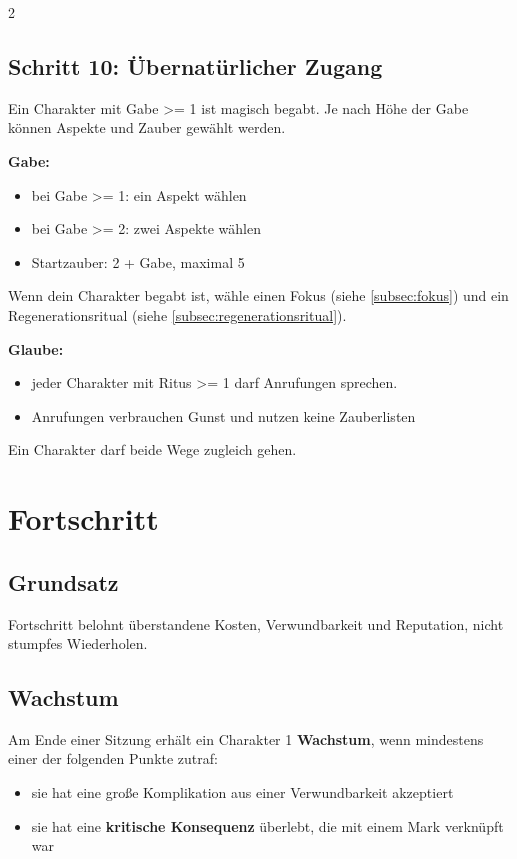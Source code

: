 \begin{multicols*}{2}
\subsection{Schritt 10: Übernatürlicher Zugang}\label{subsec:schritt-10:-ubernaturlicher-zugang}

Ein Charakter mit Gabe >= 1 ist magisch begabt.
Je nach Höhe der Gabe können Aspekte und Zauber gewählt werden.

\textbf{Gabe:}
\begin{itemize}[leftmargin=*]
\item bei Gabe >= 1: ein Aspekt wählen
\item bei Gabe >= 2: zwei Aspekte wählen
\item Startzauber: 2 + Gabe, maximal 5
\end{itemize}

Wenn dein Charakter begabt ist, wähle einen Fokus (siehe \cref{subsec:fokus}) und ein Regenerationsritual (siehe \cref{subsec:regenerationsritual}).

\textbf{Glaube:}
\begin{itemize}[leftmargin=*]
\item jeder Charakter mit Ritus >= 1 darf Anrufungen sprechen.
\item Anrufungen verbrauchen Gunst und nutzen keine Zauberlisten
\end{itemize}

Ein Charakter darf beide Wege zugleich gehen.

\section{Fortschritt}
\subsection{Grundsatz}
Fortschritt belohnt überstandene Kosten, Verwundbarkeit und Reputation, nicht stumpfes Wiederholen.

\subsection{Wachstum}
Am Ende einer Sitzung erhält ein Charakter 1 \textbf{Wachstum}, wenn mindestens einer der folgenden Punkte zutraf:
\begin{itemize}[leftmargin=*]
\item sie hat eine große Komplikation aus einer Verwundbarkeit akzeptiert
\item sie hat eine \textbf{kritische Konsequenz} überlebt, die mit einem Mark verknüpft war
\end{itemize}


\end{multicols*}
